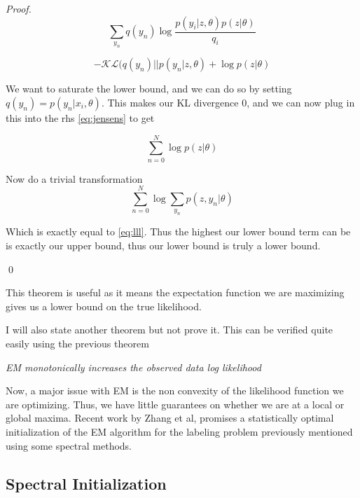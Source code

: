 \begin{theorem}
\begin{proof}
\begin{equation}
\displaystyle\sum\limits_{y_{n}} q(y_{n}) \log \frac{p(y_{i}|z,\theta)p(z| \theta)}{q_{i}}
\end{equation}

\begin{equation}
-\mathcal{KL}(q(y_{n}) || p(y_{n} | z, \theta) + \log p(z| \theta)
\end{equation}

We want to saturate the lower bound, and we can do so by setting
$q(y_{n}) = p(y_{n} | x_{i}, \theta)$. This makes our KL divergence 0,
and we can now plug in this into the rhs \eqref{eq:jensens} to get

\begin{equation}
\displaystyle\sum\limits_{n=0}^{N} \log p(z | \theta)
\end{equation}

Now do a trivial transformation
\begin{equation}
\displaystyle\sum\limits_{n=0}^{N} \log \displaystyle\sum\limits_{y_{n}}  p(z,y_{n} | \theta)
\end{equation}

Which is exactly equal to \eqref{eq:lll}. Thus the highest our lower bound term can be is exactly our upper bound, thus our lower bound is truly a lower bound.

\qed
\end{proof}

\end{theorem}

This theorem is useful as it means the expectation function we are maximizing
gives us a lower bound on the true likelihood.

I will also state another theorem but not prove it. This can be verified quite
easily using the previous theorem

\begin{theorem}
\emph{EM monotonically increases the observed data log likelihood}
\end{theorem}

Now, a major issue with EM is the non convexity of the likelihood function we
are optimizing. Thus, we have little guarantees on whether we are at a local or
global maxima. Recent work by Zhang et al, promises a statistically optimal
initialization of the EM algorithm for the labeling problem previously mentioned
using some spectral methods.

\subsection{Spectral Initialization}

